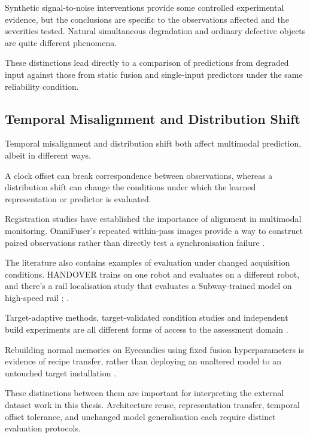 Synthetic signal-to-noise interventions provide some controlled experimental evidence, but the
conclusions are specific to the observations affected and the severities tested. Natural
simultaneous degradation and ordinary defective objects are quite different phenomena.

These distinctions lead directly to a comparison of predictions from degraded input against those
from static fusion and single-input predictors under the same reliability condition.

\subsection{Temporal Misalignment and Distribution Shift}

Temporal misalignment and distribution shift both affect multimodal prediction, albeit in different
ways.

A clock offset can break correspondence between observations, whereas a distribution shift can
change the conditions under which the learned representation or predictor is evaluated.

Registration studies have established the importance of alignment in multimodal monitoring.
OmniFuser's repeated within-pass images provide a way to construct paired observations rather than
directly test a synchronisation failure \citep{Petrich2021Multimodal,Chen2023Multisensor,P021}.

The literature also contains examples of evaluation under changed acquisition conditions. HANDOVER
trains on one robot and evaluates on a different robot, and there's a rail localisation study that
evaluates a Subway-trained model on high-speed rail \citep[PDF p.~7, Table~V]{Thoduka2024Handover};
\citep[PDF p.~10, Table~III]{P031}.

Target-adaptive methods, target-validated condition studies and independent build experiments are
all different forms of access to the assessment domain
\citep{Wang2025A,Chu2024A,Huang2026Rolling,Bevans2023Heterogeneous}.

Rebuilding normal memories on Eyecandies using fixed fusion hyperparameters is evidence of recipe
transfer, rather than deploying an unaltered model to an untouched target installation
\citep{P026,P033}.

These distinctions between them are important for interpreting the external dataset work in this
thesis. Architecture reuse, representation transfer, temporal offset tolerance, and unchanged model
generalisation each require distinct evaluation protocols.

